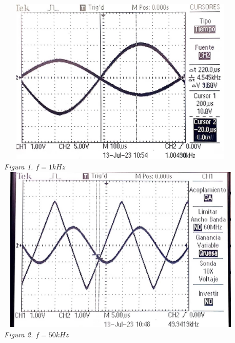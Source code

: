 \documentclass[12pt]{article}
\begin{document}
	\begin{center}
		\includegraphics[width=12cm,height=8cm]{Img/q6-1}\\
		\textit{Figura 1. $f = 1kHz$}\\
		
		\vspace{3cm}
		\includegraphics[width=12cm,height=8cm]{Img/q6-2}\\
		\textit{Figura 2. $f = 50kHz$}\\
	\end{center}
\end{document}
